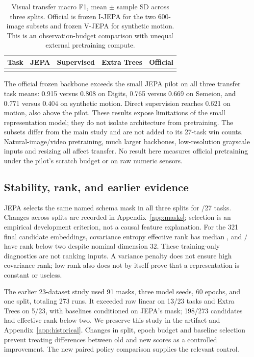 \documentclass{article}
\begin{document}
\begin{table}[t]
\caption{Visual transfer macro F1, mean $\pm$ sample SD across three splits. Official is frozen I-JEPA for the two 600-image subsets and frozen V-JEPA for synthetic motion. This is an observation-budget comparison with unequal external pretraining compute.}
\label{tab:vision}\centering\small
\begin{tabular}{lcccc}\toprule
Task & JEPA & Supervised & Extra Trees & Official\\\midrule
\\\bottomrule
\end{tabular}
\end{table}

The official frozen backbone exceeds the small JEPA pilot on all three transfer task means: 0.915 versus 0.808 on Digits, 0.765 versus 0.669 on Semeion, and 0.771 versus 0.404 on synthetic motion. Direct supervision reaches 0.621 on motion, also above the pilot. These results expose limitations of the small representation model; they do not isolate architecture from pretraining. The subsets differ from the main study and are not added to its 27-task win counts. Natural-image/video pretraining, much larger backbones, low-resolution grayscale inputs and resizing all affect transfer. No result here measures official pretraining under the pilot's scratch budget or on raw numeric sensors.

\subsection{Stability, rank, and earlier evidence}
JEPA selects the same named schema mask in all three splits for \ExtStableTasks/27 tasks. Changes across splits are recorded in Appendix~\ref{app:masks}; selection is an empirical development criterion, not a causal feature explanation. For the 321 final candidate embeddings, covariance entropy effective rank has median \ExtRankMedian{}, and \ExtRankFlags/\ExtRankRuns{} have rank below two despite nominal dimension 32. These training-only diagnostics are not ranking inputs. A variance penalty does not ensure high covariance rank; low rank also does not by itself prove that a representation is constant or useless.

The earlier 23-dataset study used 91 masks, three model seeds, 60 epochs, and one split, totaling 273 runs. It exceeded raw linear on 13/23 tasks and Extra Trees on 5/23, with baselines conditioned on JEPA's mask; 198/273 candidates had effective rank below two. We preserve this study in the artifact and Appendix~\ref{app:historical}. Changes in split, epoch budget and baseline selection prevent treating differences between old and new scores as a controlled improvement. The new paired policy comparison supplies the relevant control.
\end{document}
